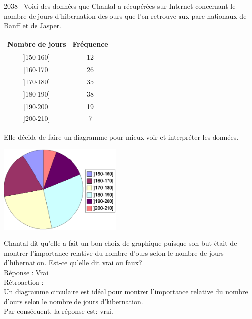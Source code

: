 \documentclass[letterpaper, 12pt]{article}
\begin{document}
2038-- Voici des donn\'ees que Chantal a r\'ecup\'er\'ees sur Internet concernant le nombre de jours d'hibernation des ours que l'on retrouve aux parc nationaux de Banff et de Jasper.
\begin{center}
 \begin{tabular}{| c | c |} \hline
{\bf Nombre de jours } & {\bf Fr\'equence} \\ \hline \hline

]150-160] & 12 \\
]160-170] & 26 \\
]170-180] & 35  \\
]180-190] & 38  \\
]190-200] & 19  \\
]200-210] & 7   \\

\hline
\end{tabular}
\end{center}
Elle d\'ecide de faire un diagramme pour mieux voir et interpr\'eter les donn\'ees.
\begin{center}

 \includegraphics[width=6cm]{graphQ2038.eps}

\end{center}
Chantal dit qu'elle a fait un bon choix de graphique puisque son but \'etait de montrer l'importance relative du nombre d'ours selon le nombre de jours d'hibernation. Est-ce qu'elle dit vrai ou faux?\\

R\'eponse : Vrai\\

R\'etroaction :\\
Un diagramme circulaire est id\'eal pour montrer l'importance relative du nombre d'ours selon le nombre de jours d'hibernation. \\
Par cons\'equent, la r\'eponse est: vrai.\\
\end{document}
